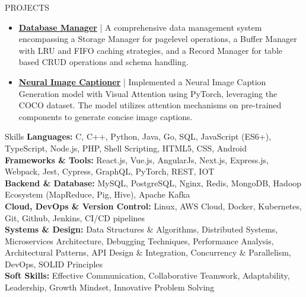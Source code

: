 \documentclass{resume} %
\begin{document}
\vspace{-5pt}
\begin{rSection}{PROJECTS}
   \vspace{0.6em}

   \begin{minipage}[t]{1\textwidth}
      \begin{itemize}[left=0pt, nosep, before=\vspace{-0.5\baselineskip}]
         \item \small \textbf{\href{https://github.com/Prajwal-S-Venkatesh/buffer-manager-c}{Database Manager}} | {A comprehensive data management system encompassing a Storage Manager for page\-level operations, a Buffer Manager with LRU and FIFO caching strategies, and a Record Manager for table based CRUD operations and schema handling.}
         \item \small \textbf{\href{https://github.com/Prajwal-S-Venkatesh/image-captioner}{Neural Image Captioner}} | {Implemented a Neural Image Caption Generation model with Visual Attention using PyTorch, leveraging the COCO dataset. The model utilizes attention mechanisms on pre-trained components to generate concise image captions.}
         \vspace{0.25em}
      \end{itemize}
   \end{minipage}
   
   \end{rSection} 
      
\vspace{-5pt}
\begin{rSection}{Skills}
   \small \textbf{Languages:} C, C++, Python, Java, Go, SQL, JavaScript (ES6+), TypeScript, Node.js, PHP, Shell Scripting, HTML5, CSS, Android \\
   \small \textbf{Frameworks \& Tools:} React.js, Vue.js, AngularJs, Next.js, Express.js, Webpack, Jest, Cypress, GraphQL, PyTorch, REST, IOT \\
   \small \textbf{Backend \& Database:} MySQL, PostgreSQL, Nginx, Redis, MongoDB, Hadoop Ecosystem (MapReduce, Pig, Hive), Apache Kafka \\
   \small \textbf{Cloud, DevOps \& Version Control:} Linux, AWS Cloud, Docker, Kubernetes, Git, Github, Jenkins, CI/CD pipelines \\
\textbf{Systems \& Design:} Data Structures \& Algorithms, Distributed Systems, Microservices Architecture, Debugging Techniques, Performance Analysis, Architectural Patterns, API Design \& Integration, Concurrency \& Parallelism, DevOps, SOLID Principles \\
   \small \textbf{Soft Skills:} Effective Communication, Collaborative Teamwork, Adaptability, Leadership, Growth Mindset, Innovative Problem Solving \\
\end{rSection}


\end{document}
